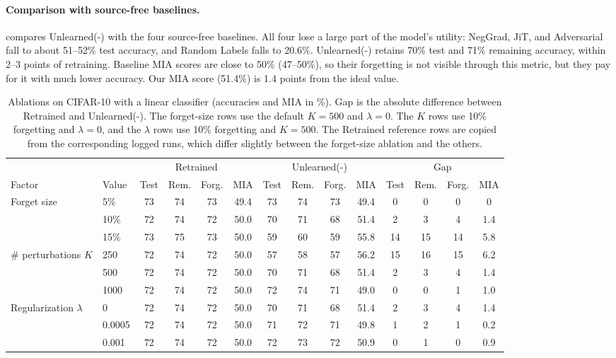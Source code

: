\documentclass[10pt,twocolumn,letterpaper]{article}
\begin{document}
\paragraph{Comparison with source-free baselines.}
 compares Unlearned(-) with the four source-free baselines. All four lose a large part of the model's utility: NegGrad, JiT, and Adversarial fall to about 51--52\% test accuracy, and Random Labels falls to 20.6\%. Unlearned(-) retains 70\% test and 71\% remaining accuracy, within 2--3 points of retraining. Baseline MIA scores are close to 50\% (47--50\%), so their forgetting is not visible through this metric, but they pay for it with much lower accuracy. Our MIA score (51.4\%) is 1.4 points from the ideal value.

\begin{table}[t]
\centering
\footnotesize
\setlength{\tabcolsep}{3.2pt}
\begin{tabular}{@{}llcccccccccccc@{}}
\toprule
& & \multicolumn{4}{c}{Retrained} & \multicolumn{4}{c}{Unlearned(-)} & \multicolumn{4}{c}{Gap} \\
\cmidrule(lr){3-6}\cmidrule(lr){7-10}\cmidrule(l){11-14}
Factor & Value & Test & Rem. & Forg. & MIA & Test & Rem. & Forg. & MIA & Test & Rem. & Forg. & MIA \\
\midrule
\multirow{3}{*}{Forget size}
 & 5\%  & 73 & 74 & 73 & 49.4 & 73 & 74 & 73 & 49.4 & 0 & 0 & 0 & 0 \\
 & 10\% & 72 & 74 & 72 & 50.0 & 70 & 71 & 68 & 51.4 & 2 & 3 & 4 & 1.4 \\
 & 15\% & 73 & 75 & 73 & 50.0 & 59 & 60 & 59 & 55.8 & 14 & 15 & 14 & 5.8 \\
\midrule
\multirow{3}{*}{\# perturbations $K$}
 & 250  & 72 & 74 & 72 & 50.0 & 57 & 58 & 57 & 56.2 & 15 & 16 & 15 & 6.2 \\
 & 500  & 72 & 74 & 72 & 50.0 & 70 & 71 & 68 & 51.4 & 2 & 3 & 4 & 1.4 \\
 & 1000 & 72 & 74 & 72 & 50.0 & 72 & 74 & 71 & 49.0 & 0 & 0 & 1 & 1.0 \\
\midrule
\multirow{3}{*}{Regularization $\lambda$}
 & 0      & 72 & 74 & 72 & 50.0 & 70 & 71 & 68 & 51.4 & 2 & 3 & 4 & 1.4 \\
 & 0.0005 & 72 & 74 & 72 & 50.0 & 71 & 72 & 71 & 49.8 & 1 & 2 & 1 & 0.2 \\
 & 0.001  & 72 & 74 & 72 & 50.0 & 72 & 73 & 72 & 50.9 & 0 & 1 & 0 & 0.9 \\
\bottomrule
\end{tabular}
\caption{Ablations on CIFAR-10 with a linear classifier (accuracies and MIA in \%). Gap is the absolute difference between Retrained and Unlearned(-). The forget-size rows use the default $K=500$ and $\lambda=0$. The $K$ rows use 10\% forgetting and $\lambda=0$, and the $\lambda$ rows use 10\% forgetting and $K=500$. The Retrained reference rows are copied from the corresponding logged runs, which differ slightly between the forget-size ablation and the others.}
\label{tab:ablation}
\end{table}
\end{document}
